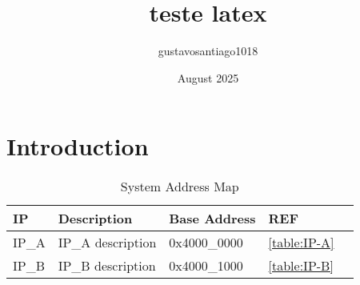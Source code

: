 \documentclass{article}
\title{teste latex}
\author{gustavosantiago1018 }
\date{August 2025}
\begin{document}
\maketitle

\section{Introduction}


\begin{table}[h]
\centering
\caption{System Address Map}
\label{table:system_address_map}
\begin{tabular}{|l|l|l|l|l|}
\hline
\textbf{IP} & \textbf{Description} & \textbf{Base Address} & \textbf{REF} \\ \hline
IP\_A & IP\_A description & 0x4000\_0000  & \ref{table:IP-A} \\ \hline
IP\_B & IP\_B description & 0x4000\_1000  & \ref{table:IP-B} \\ \hline
\end{tabular}
\end{table}
\end{document}

